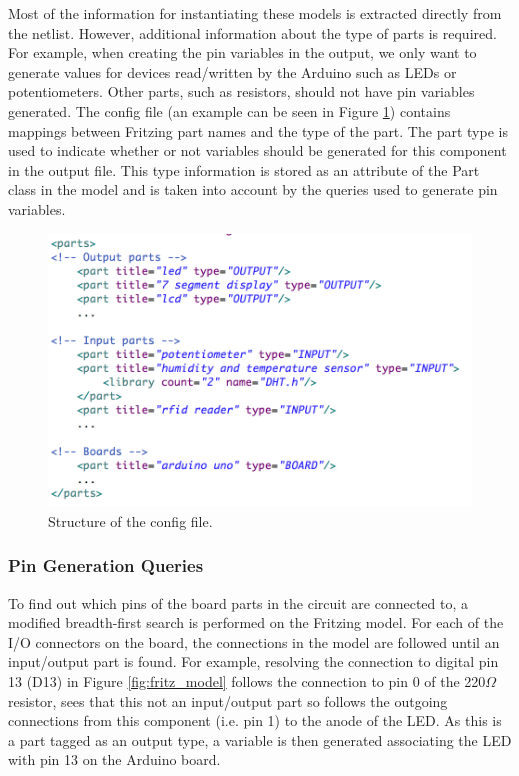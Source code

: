 \documentclass{UoYCSproject}
\begin{document}
Most of the information for instantiating these models is extracted directly from the netlist. However, additional information about the type of parts is required. For example, when creating the pin variables in the output, we only want to generate values for devices read/written by the Arduino such as LEDs or potentiometers. Other parts, such as resistors, should not have pin variables generated. The config file (an example can be seen in Figure \ref{fig:config}) contains mappings between Fritzing part names and the type of the part. The part type is used to indicate whether or not variables should be generated for this component in the output file. This type information is stored as an attribute of the Part class in the model and is taken into account by the queries used to generate pin variables.

\begin{figure}[h!]
  \centering
  \includegraphics[width=0.6\linewidth]{graphics/config_file.png}
  \caption{Structure of the config file.}
  \label{fig:config}
\end{figure}

\subsubsection{Pin Generation Queries}
To find out which pins of the board parts in the circuit are connected to, a modified breadth-first search is performed on the Fritzing model. For each of the I/O connectors on the board, the connections in the model are followed until an input/output part is found. For example, resolving the connection to digital pin 13 (D13) in Figure \ref{fig:fritz_model} follows the connection to pin 0 of the 220$\Omega$ resistor, sees that this not an input/output part so follows the outgoing connections from this component (i.e. pin 1) to the anode of the LED. As this is a part tagged as an output type, a variable is then generated associating the LED with pin 13 on the Arduino board.

\end{document}

